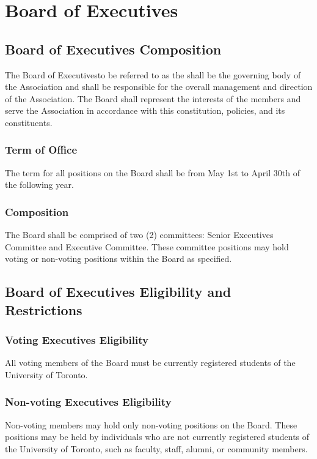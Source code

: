 \chapter{Board of Executives}

\section{Board of Executives Composition}

The Board of Executives\textemdash to be referred to as the 
\textemdash 
shall be the governing body of the Association and shall be responsible 
for the overall management and direction of the Association. 
The Board shall represent the interests of the members and serve the 
Association in accordance with this constitution, policies, and its
constituents.

\subsection{Term of Office}
The term for all positions on the Board shall be from 
May 1st to April 30th of the following year.

\subsection{Composition}
The Board shall be comprised of two (2) committees: 
Senior Executives Committee and Executive Committee. 
These committee positions may hold voting or non-voting positions within 
the Board as specified.

\section{Board of Executives Eligibility and Restrictions}

\subsection{Voting Executives Eligibility}\label{voting-exec-eligibility}
All voting members of the Board must be currently 
registered students of the University of Toronto.

\subsection{Non-voting Executives Eligibility}\label{non-voting-exec-eligibility}
Non-voting members may hold only non-voting positions on the Board.
These positions may be held by individuals who are not
currently registered students of the University of Toronto, such as
faculty, staff, alumni, or community members.


